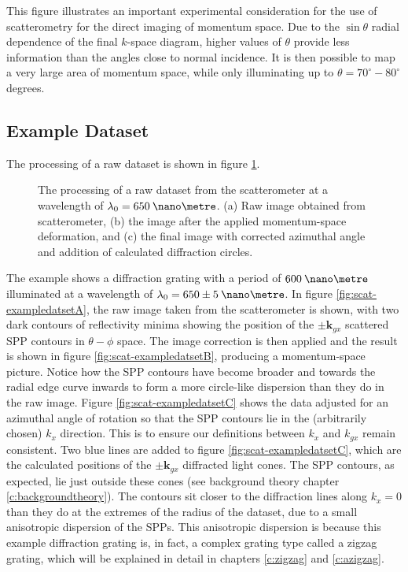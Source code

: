 This figure illustrates an important experimental consideration for the use of scatterometry for the direct imaging of momentum space. Due to the $\sin \theta$ radial dependence of the final $k$-space diagram,  higher values of $\theta$ provide less information than the angles close to normal incidence. It is then possible to map a very large area of momentum space, while only illuminating up to $\theta=70^\circ-80^\circ$ degrees.

\subsection{Example Dataset}
The processing of a raw dataset is shown in figure \ref{fig:scat-exampledatset}.
\begin{figure}
\begin{center}
\end{center}
\caption[The processing of a raw dataset from the scatterometer at a wavelength of $\lambda_0=650\:\nano\metre$.]{The processing of a raw dataset from the scatterometer at a wavelength of $\lambda_0=650\:\nano\metre$. (a) Raw image obtained from scatterometer, (b) the image after the applied momentum-space deformation, and (c) the final image with corrected azimuthal angle and addition of calculated diffraction circles.\label{fig:scat-exampledatset}}
\end{figure}
The example shows a diffraction grating with a period of $600\:\nano\metre$ illuminated at a wavelength of ${\lambda_0=650\pm5\:\nano\metre}$. In figure \ref{fig:scat-exampledatsetA}, the raw image taken from the scatterometer is shown, with two dark contours of reflectivity minima showing the position of the $\pm\mathbf{k}_{gx}$ scattered SPP contours in $\theta- \phi$ space. The image correction is then applied and the result is shown in figure \ref{fig:scat-exampledatsetB}, producing a momentum-space picture. Notice how the SPP contours have become broader and towards the radial edge curve inwards to form a more circle-like dispersion than they do in the raw image. Figure \ref{fig:scat-exampledatsetC} shows the data adjusted for an azimuthal angle of rotation so that the SPP contours lie in the (arbitrarily chosen) $k_x$ direction. This is to ensure our definitions between $k_x$ and $k_{gx}$ remain consistent. Two blue lines are added to figure \ref{fig:scat-exampledatsetC}, which are the calculated positions of the $\pm\mathbf{k}_{gx}$ diffracted light cones. The SPP contours, as expected, lie just outside these cones (see background theory chapter \ref{c:backgroundtheory}). The contours sit closer to the diffraction lines along $k_x=0$ than they do at the extremes of the radius of the dataset, due to a small anisotropic dispersion of the SPPs. This anisotropic dispersion is because this example diffraction grating is, in fact, a complex grating type called a zigzag grating, which will be explained in detail in chapters \ref{c:zigzag} and \ref{c:azigzag}.
